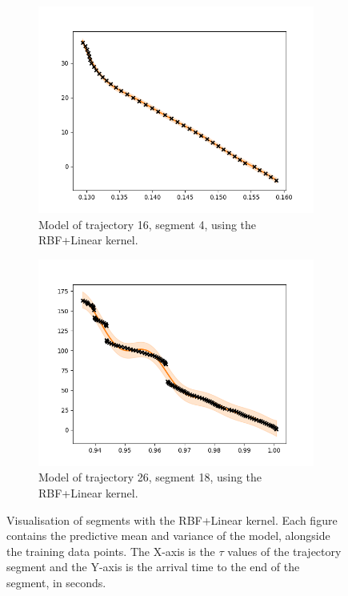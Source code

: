 \begin{figure}
    \centering
    \begin{subfigure}[b]{0.475\textwidth}   
        \centering
        \includegraphics[width=\textwidth]{figures/forecasting/gp_16_4_rbf_linear}
        \caption[]%
        {{\small Model of trajectory 16, segment 4, using the RBF+Linear kernel.}}    
        \label{fig:16-4-rbf-linear}
    \end{subfigure}
    \quad
    \begin{subfigure}[b]{0.475\textwidth}   
        \centering 
        \includegraphics[width=\textwidth]{figures/forecasting/gp_26_18_rbf_linear}
        \caption[]%
        {{\small Model of trajectory 26, segment 18, using the RBF+Linear kernel.}}    
        \label{fig:26-18-rbf-linear}
    \end{subfigure}
    \caption[ Visualisation of arbitrary segments with the RBF+Linear kernel ]
    {{\small Visualisation of segments with the RBF+Linear kernel.
    Each figure contains the predictive mean and variance of the model, alongside the training data points.  
    The X-axis is the $\tau$ values of the trajectory segment and the Y-axis is the arrival time to the end of the segment, in seconds.}} 
    \label{fig:good-kernel-results}
\end{figure}

